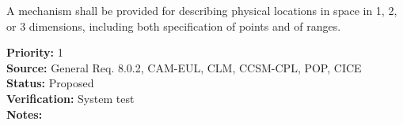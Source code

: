 

A mechanism shall be provided for describing physical locations in space in 1,
2, or 3 dimensions, including both specification of points and of ranges.
\begin{reqlist}
{\bf Priority:} 1 \\
{\bf Source:} General Req. 8.0.2, CAM-EUL, CLM, CCSM-CPL, POP, CICE \\
{\bf Status:} Proposed \\
{\bf Verification:} System test\\
{\bf Notes:} 
\end{reqlist}

